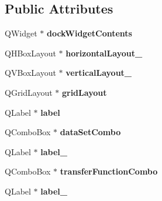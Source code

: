 \subsection*{\-Public \-Attributes}
\begin{DoxyCompactItemize}
\item 
\hypertarget{class_ui___scene_widget_aa37309f304b7cc893af016fdc74dbde6}{\-Q\-Widget $\ast$ {\bfseries dock\-Widget\-Contents}}\label{class_ui___scene_widget_aa37309f304b7cc893af016fdc74dbde6}

\item 
\hypertarget{class_ui___scene_widget_a258771c54e3fca5b9ffce48a1135d2d3}{\-Q\-H\-Box\-Layout $\ast$ {\bfseries horizontal\-Layout\-\_}}\label{class_ui___scene_widget_a258771c54e3fca5b9ffce48a1135d2d3}

\item 
\hypertarget{class_ui___scene_widget_a9e818b7b95f75173d0a3c5efdd6bdb4b}{\-Q\-V\-Box\-Layout $\ast$ {\bfseries vertical\-Layout\-\_}}\label{class_ui___scene_widget_a9e818b7b95f75173d0a3c5efdd6bdb4b}

\item 
\hypertarget{class_ui___scene_widget_a4bb7c1099248b13db87167f7d81c4a57}{\-Q\-Grid\-Layout $\ast$ {\bfseries grid\-Layout}}\label{class_ui___scene_widget_a4bb7c1099248b13db87167f7d81c4a57}

\item 
\hypertarget{class_ui___scene_widget_a534a09396c7ef7e0018e8ee6e1b3d021}{\-Q\-Label $\ast$ {\bfseries label}}\label{class_ui___scene_widget_a534a09396c7ef7e0018e8ee6e1b3d021}

\item 
\hypertarget{class_ui___scene_widget_ad31ab1a32cb98d2aa749b9a1442f25be}{\-Q\-Combo\-Box $\ast$ {\bfseries data\-Set\-Combo}}\label{class_ui___scene_widget_ad31ab1a32cb98d2aa749b9a1442f25be}

\item 
\hypertarget{class_ui___scene_widget_ae6a7756d8b4910a98ff932198c6ef584}{\-Q\-Label $\ast$ {\bfseries label\-\_}}\label{class_ui___scene_widget_ae6a7756d8b4910a98ff932198c6ef584}

\item 
\hypertarget{class_ui___scene_widget_a82771c812f9e7d28241c60f81741a499}{\-Q\-Combo\-Box $\ast$ {\bfseries transfer\-Function\-Combo}}\label{class_ui___scene_widget_a82771c812f9e7d28241c60f81741a499}

\item 
\hypertarget{class_ui___scene_widget_a7d1f2926d78cfdbf0055993ae10399d7}{\-Q\-Label $\ast$ {\bfseries label\-\_}}\label{class_ui___scene_widget_a7d1f2926d78cfdbf0055993ae10399d7}


\end{DoxyCompactItemize}
